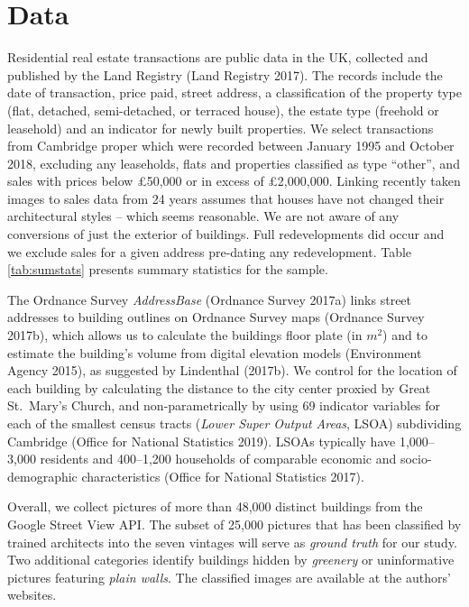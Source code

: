 \documentclass[]{article}
\begin{document}
\hypertarget{data}{%
\section{Data}\label{data}}

Residential real estate transactions are public data in the UK,
collected and published by the Land Registry (Land Registry 2017). The
records include the date of transaction, price paid, street address, a
classification of the property type (flat, detached, semi-detached, or
terraced house), the estate type (freehold or leasehold) and an
indicator for newly built properties. We select transactions from
Cambridge proper which were recorded between January 1995 and October
2018, excluding any leaseholds, flats and properties classified as type
``other'', and sales with prices below £50,000 or in excess of
£2,000,000. Linking recently taken images to sales data from 24 years
assumes that houses have not changed their architectural styles -- which
seems reasonable. We are not aware of any conversions of just the
exterior of buildings. Full redevelopments did occur and we exclude
sales for a given address pre-dating any redevelopment. Table
\ref{tab:sumstats} presents summary statistics for the sample.

The Ordnance Survey \emph{AddressBase} (Ordnance Survey 2017a) links
street addresses to building outlines on Ordnance Survey maps (Ordnance
Survey 2017b), which allows us to calculate the buildings floor plate
(in \(m^2\)) and to estimate the building's volume from digital
elevation models (Environment Agency 2015), as suggested by Lindenthal
(2017b). We control for the location of each building by calculating the
distance to the city center proxied by Great St.~Mary's Church, and
non-parametrically by using 69 indicator variables for each of the
smallest census tracts (\emph{Lower Super Output Areas}, LSOA)
subdividing Cambridge (Office for National Statistics 2019). LSOAs
typically have 1,000--3,000 residents and 400--1,200 households of
comparable economic and socio-demographic characteristics (Office for
National Statistics 2017).

Overall, we collect pictures of more than 48,000 distinct buildings from
the Google Street View API. The subset of 25,000 pictures that has been
classified by trained architects into the seven vintages will serve as
\emph{ground truth} for our study. Two additional categories identify
buildings hidden by \emph{greenery} or uninformative pictures featuring
\emph{plain walls}. The classified images are available at the authors'
websites.
\end{document}
